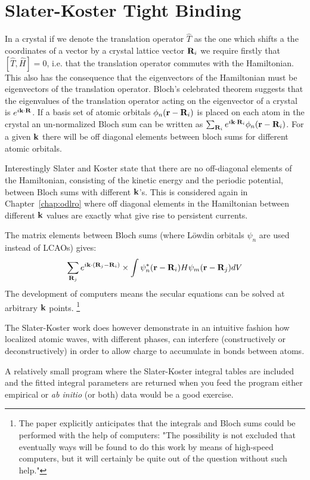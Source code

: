 \section{Slater-Koster Tight Binding}
  In a crystal if we denote the translation operator $\hat{T}$
as the one which shifts a the coordinates of a vector by a crystal lattice vector 
${\bf R}_{i}$ we require firstly that $[\hat{T},\hat{H}]=0$, i.e. that the 
translation operator commutes with the Hamiltonian. This also
has the consequence that the eigenvectors of the Hamiltonian
must be eigenvectors of the translation operator. Bloch's 
celebrated theorem suggests that the eigenvalues of the 
translation operator acting on the eigenvector of a crystal is $e^{i{\bf k}\cdot{\bf R}}$.
If a basis set of atomic orbitals $\phi_{n}({\bf r}-{\bf R}_{i})$
is placed on each atom in the crystal an un-normalized Bloch sum can be 
written as $\sum_{{\bf R}_{i}} e^{i{\bf k}\cdot{\bf R}_{i}}\phi_{n}({\bf r}-{\bf R}_{i})$. For
a given ${\bf k}$ there will be off diagonal elements between bloch sums
for different atomic orbitals.

  Interestingly Slater and Koster state that there are no off-diagonal
elements of the Hamiltonian, consisting of the kinetic energy and the periodic potential, 
between Bloch sums with different ${\bf k}$'s. This is considered again in Chapter~\ref{chap:odlro}
where off diagonal elements in the Hamiltonian between different ${\bf k}$ values are exactly what give
rise to persistent currents.

  The matrix elements between Bloch sums (where L\"owdin orbitals $\psi_{n}$
are used instead of LCAOs) gives:
%
\begin{equation}
\sum_{{\bf R}_{j}} e^{i{\bf k}\cdot({\bf R}_{j}-{\bf R}_{i})}\times\int \psi^{*}_{n}({\bf r}-{\bf R}_{i})H\psi_{m}({\bf r}-{\bf R}_{j})dV
\end{equation}
%
The development of computers means the secular equations can be solved 
at arbitrary ${\bf k}$ points. \footnote{The paper explicitly anticipates that the integrals and Bloch 
sums could be performed with the help of computers: "The possibility is not excluded 
that eventually ways will be found to do this work by means of high-speed computers, but
it will certainly be quite out of the question without such help."} 

The Slater-Koster work does however demonstrate in an intuitive fashion how localized atomic
waves, with different phases, can interfere (constructively or deconstructively) in order
to allow charge to accumulate in bonds between atoms.

A relatively small program where the Slater-Koster integral tables are included and
the fitted integral parameters are returned when you feed the program either empirical
or {\it ab initio} (or both) data would be a good exercise.


